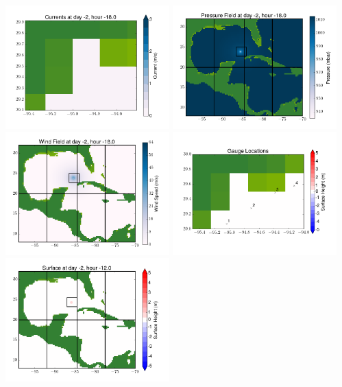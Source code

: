 \documentclass[11pt]{article}
\begin{document}
\vskip 10pt 
\includegraphics[width=0.475\textwidth]{frame0001fig7.png}
\includegraphics[width=0.475\textwidth]{frame0001fig8.png}
\vskip 10pt 
\includegraphics[width=0.475\textwidth]{frame0001fig9.png}
\includegraphics[width=0.475\textwidth]{frame0001fig10.png}
\vskip 10pt 
\includegraphics[width=0.475\textwidth]{frame0002fig1.png}
\end{document}
